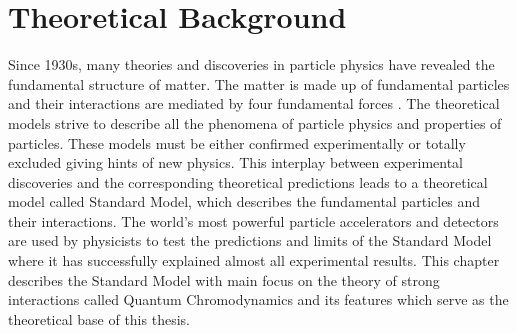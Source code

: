 \chapter{Theoretical Background}
\label{chap:Theory}
Since 1930s, many theories and discoveries in particle physics have revealed the fundamental structure of matter. The matter is made up of fundamental particles and their interactions are mediated by four fundamental forces \cite{Griffiths:111880}. The theoretical models strive to describe all the phenomena of particle physics and properties of particles. These models must be either confirmed experimentally or totally excluded giving hints of new physics. This interplay between experimental discoveries and the corresponding theoretical predictions leads to a theoretical model called Standard Model, which describes the fundamental particles and their interactions. The world's most powerful particle accelerators and detectors are used by physicists to test the predictions and limits of the Standard Model where it has successfully explained almost all experimental results. This chapter describes the Standard Model with main focus on the theory of strong interactions called Quantum Chromodynamics and its features which serve as the theoretical base of this thesis.


